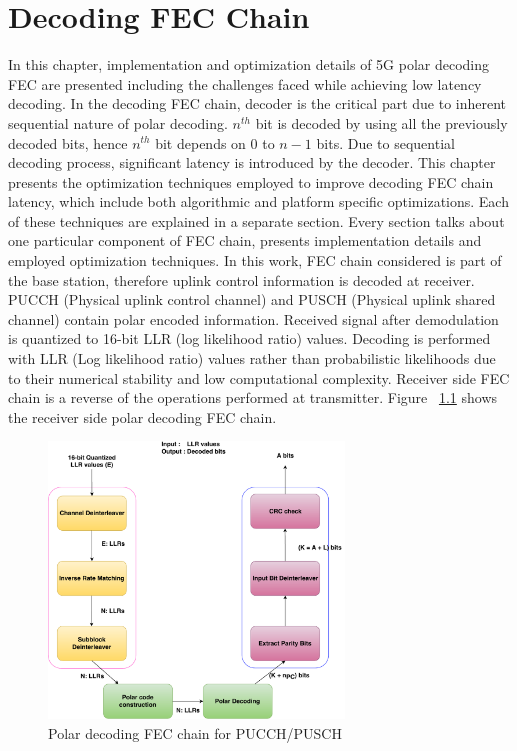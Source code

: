 \chapter{Decoding FEC Chain} \label{chap:DecodingChain}
In this chapter, implementation and optimization details of 5G polar decoding FEC are presented including the challenges faced while achieving low latency decoding. In the decoding FEC chain, decoder is the critical part due to inherent sequential nature of polar decoding. $n^{th}$ bit is decoded by using all the previously decoded bits, hence $n^{th}$ bit depends on $0$ to $n-1$ bits. Due to sequential decoding process, significant latency is introduced by the decoder. This chapter presents the optimization techniques employed to improve decoding FEC chain latency, which include both algorithmic and platform specific optimizations. Each of these techniques are explained in a separate section. Every section talks about one particular component of FEC chain, presents implementation details and employed optimization techniques. In this work, FEC chain considered is part of the base station, therefore uplink control information is decoded at receiver. PUCCH (Physical uplink control channel) and PUSCH (Physical uplink shared channel) contain polar encoded information. Received signal after demodulation is quantized to 16-bit LLR (log likelihood ratio) values. Decoding is performed with LLR (Log likelihood ratio) values rather than probabilistic likelihoods due to their numerical stability and low computational complexity. Receiver side FEC chain is a reverse of the operations performed at transmitter. Figure ~\ref{fig:5grx_fec_chain} shows the receiver side polar decoding FEC chain.

\begin{figure}[]
	\centering
	\includegraphics[width=0.7\textwidth]{./figures/receiverFECChain_crc.pdf}
	\caption{Polar decoding FEC chain for PUCCH/PUSCH}
	\label{fig:5grx_fec_chain}
\end{figure}

